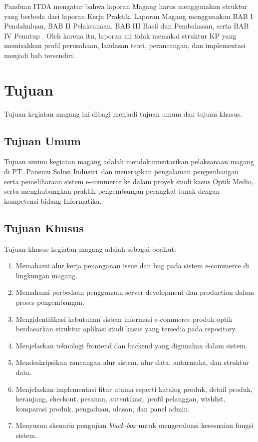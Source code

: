 \documentclass[12pt,a4paper,oneside]{report}
\newcommand{\tempatmagang}{PT. Panemu Solusi Industri}
\newcommand{\proyekstudi}{Optik Medio}
\begin{document}
Panduan ITDA mengatur bahwa laporan Magang harus menggunakan struktur yang berbeda dari laporan Kerja Praktik. Laporan Magang menggunakan BAB I Pendahuluan, BAB II Pelaksanaan, BAB III Hasil dan Pembahasan, serta BAB IV Penutup \cite{itda2024panduan}. Oleh karena itu, laporan ini tidak memakai struktur KP yang memisahkan profil perusahaan, landasan teori, perancangan, dan implementasi menjadi bab tersendiri.

\section{Tujuan}

Tujuan kegiatan magang ini dibagi menjadi tujuan umum dan tujuan khusus.

\subsection{Tujuan Umum}

Tujuan umum kegiatan magang adalah mendokumentasikan pelaksanaan magang di \tempatmagang\ dan menerapkan pengalaman pengembangan serta pemeliharaan sistem e-commerce ke dalam proyek studi kasus \proyekstudi, serta menghubungkan praktik pengembangan perangkat lunak dengan kompetensi bidang Informatika.

\subsection{Tujuan Khusus}

Tujuan khusus kegiatan magang adalah sebagai berikut:

\begin{enumerate}
  \item Memahami alur kerja penanganan issue dan bug pada sistem e-commerce di lingkungan magang.
  \item Memahami perbedaan penggunaan server development dan production dalam proses pengembangan.
  \item Mengidentifikasi kebutuhan sistem informasi e-commerce produk optik berdasarkan struktur aplikasi studi kasus yang tersedia pada repository.
  \item Menjelaskan teknologi frontend dan backend yang digunakan dalam sistem.
  \item Mendeskripsikan rancangan alur sistem, alur data, antarmuka, dan struktur data.
  \item Menjelaskan implementasi fitur utama seperti katalog produk, detail produk, keranjang, checkout, pesanan, autentikasi, profil pelanggan, wishlist, komparasi produk, pengaduan, ulasan, dan panel admin.
  \item Menyusun skenario pengujian \textit{black-box} untuk mengevaluasi kesesuaian fungsi sistem.
\end{enumerate}
\end{document}
